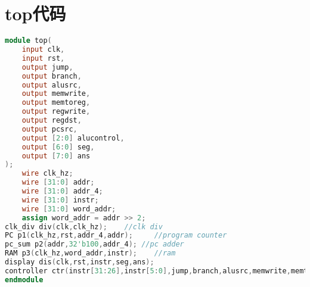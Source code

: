 \section{top代码}
\begin{lstlisting}[language=Verilog]
    module top(
    input clk,
    input rst,
    output jump,
    output branch,
    output alusrc,
    output memwrite,
    output memtoreg,
    output regwrite,
    output regdst,
    output pcsrc,
    output [2:0] alucontrol,
    output [6:0] seg,
    output [7:0] ans
);
    wire clk_hz;
    wire [31:0] addr;
    wire [31:0] addr_4;
    wire [31:0] instr;
    wire [31:0] word_addr;
    assign word_addr = addr >> 2;
clk_div div(clk,clk_hz);    //clk div
PC p1(clk_hz,rst,addr_4,addr);     //program counter
pc_sum p2(addr,32'b100,addr_4); //pc adder
RAM p3(clk_hz,word_addr,instr);    //ram
display dis(clk,rst,instr,seg,ans); 
controller ctr(instr[31:26],instr[5:0],jump,branch,alusrc,memwrite,memtoreg,regwrite,regdst,pcsrc,alucontrol);
endmodule
\end{lstlisting}
